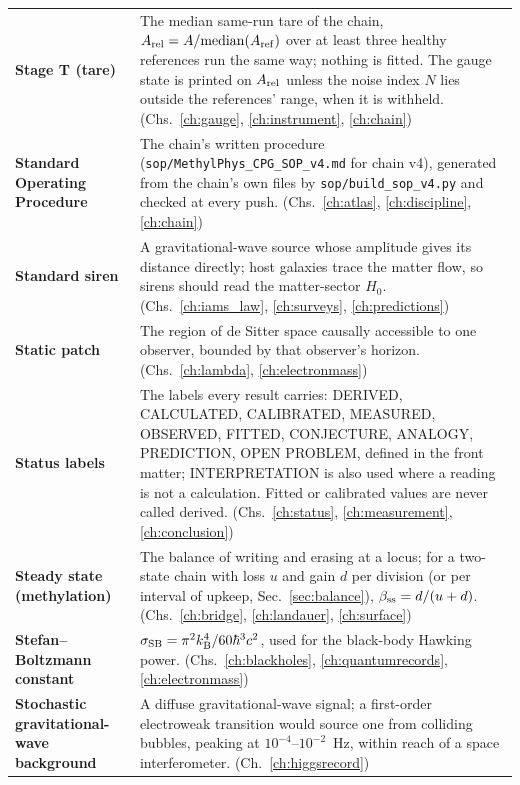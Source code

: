 {\begin{longtable}{@{}>{\raggedright\arraybackslash}p{}>{\raggedright\arraybackslash}p{}@{}}
\textbf{Stage T (tare)} & The median same-run tare of the chain, $A_{\rm rel}=A/\mathrm{median}(A_{\rm ref})$ over at least three healthy references run the same way; nothing is fitted. The gauge state is printed on $A_{\rm rel}$ unless the noise index $N$ lies outside the references' range, when it is withheld. {\footnotesize(Chs.~\ref{ch:gauge}, \ref{ch:instrument}, \ref{ch:chain})}\\[1pt]
\textbf{Standard Operating Procedure} & The chain's written procedure (\texttt{sop/\allowbreak{}MethylPhys\_CPG\_SOP\_v4.md} for chain v4), generated from the chain's own files by \texttt{sop/\allowbreak{}build\_sop\_v4.py} and checked at every push. {\footnotesize(Chs.~\ref{ch:atlas}, \ref{ch:discipline}, \ref{ch:chain})}\\[1pt]
\textbf{Standard siren} & A gravitational-wave source whose amplitude gives its distance directly; host galaxies trace the matter flow, so sirens should read the matter-sector $H_0$. {\footnotesize(Chs.~\ref{ch:iams_law}, \ref{ch:surveys}, \ref{ch:predictions})}\\[1pt]
\textbf{Static patch} & The region of de Sitter space causally accessible to one observer, bounded by that observer's horizon. {\footnotesize(Chs.~\ref{ch:lambda}, \ref{ch:electronmass})}\\[1pt]
\textbf{Status labels} & The labels every result carries: DERIVED, CALCULATED, CALIBRATED, MEASURED, OBSERVED, FITTED, CONJECTURE, ANALOGY, PREDICTION, OPEN PROBLEM, defined in the front matter; INTERPRETATION is also used where a reading is not a calculation. Fitted or calibrated values are never called derived. {\footnotesize(Chs.~\ref{ch:status}, \ref{ch:measurement}, \ref{ch:conclusion})}\\[1pt]
\textbf{Steady state (methylation)} & The balance of writing and erasing at a locus; for a two-state chain with loss $u$ and gain $d$ per division (or per interval of upkeep, Sec.~\ref{sec:balance}), $\beta_{\rm ss}=d/(u+d)$. {\footnotesize(Chs.~\ref{ch:bridge}, \ref{ch:landauer}, \ref{ch:surface})}\\[1pt]
\textbf{Stefan--Boltzmann constant} & $\sigma_{\rm SB}=\pi^2k_{\mathrm B}^4/60\hbar^3c^2$, used for the black-body Hawking power. {\footnotesize(Chs.~\ref{ch:blackholes}, \ref{ch:quantumrecords}, \ref{ch:electronmass})}\\[1pt]
\textbf{Stochastic gravitational-wave background} & A diffuse gravitational-wave signal; a first-order electroweak transition would source one from colliding bubbles, peaking at $10^{-4}$--$10^{-2}$~Hz, within reach of a space interferometer. {\footnotesize(Ch.~\ref{ch:higgsrecord})}\\[1pt]

\end{longtable}}
